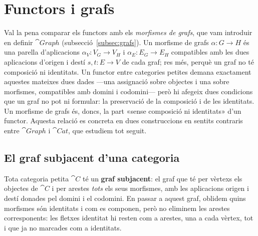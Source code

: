\section{Functors i grafs}\label{sec:functors-grafs}

Val la pena comparar els functors amb els \emph{morfismes de grafs}, que vam introduir en definir $\cat{Graph}$ (subsecció~\ref{subsec:grafs}). Un morfisme de grafs $\alpha\colon G\to H$ és una parella d'aplicacions $\alpha_V\colon V_G\to V_H$ i $\alpha_E\colon E_G\to E_H$ compatibles amb les dues aplicacions d'origen i destí $s,t\colon E\to V$ de cada graf; res més, perquè un graf no té composició ni identitats. Un functor entre categories petites demana exactament aquestes mateixes dues dades ---una assignació sobre objectes i una sobre morfismes, compatibles amb domini i codomini--- però hi afegeix dues condicions que un graf no pot ni formular: la preservació de la composició i de les identitats. Un morfisme de grafs és, doncs, la part «sense composició ni identitats» d'un functor. Aquesta relació es concreta en dues construccions en sentits contraris entre $\cat{Graph}$ i $\cat{Cat}$, que estudiem tot seguit.

\subsection{El graf subjacent d'una categoria}

Tota categoria petita $\cat{C}$ té un \textbf{graf subjacent}: el graf que té per vèrtexs els objectes de $\cat{C}$ i per arestes \emph{tots} els seus morfismes, amb les aplicacions origen i destí donades pel domini i el codomini. En passar a aquest graf, oblidem quins morfismes són identitats i com es componen, però no eliminem les arestes corresponents: les fletxes identitat hi resten com a arestes, una a cada vèrtex, tot i que ja no marcades com a identitats.

